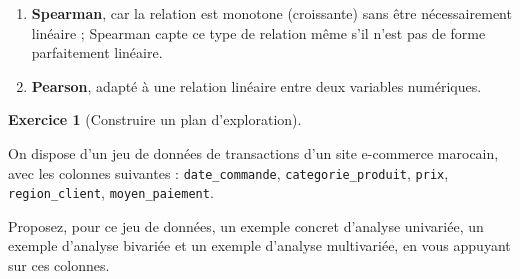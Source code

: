 \documentclass[
  french,
  letterpaper,
  open=any]{scrbook}
\providecommand{\tightlist}{%
  \setlength{\itemsep}{0pt}\setlength{\parskip}{0pt}}
\theoremstyle{definition}
\theoremstyle{definition}
\newtheorem{exercise}{Exercice}[section]
\theoremstyle{remark}
\begin{document}
\begin{tcolorbox}[enhanced jigsaw, arc=.35mm, bottomrule=.15mm, bottomtitle=1mm, breakable, colback=white, colbacktitle=quarto-callout-tip-color!10!white, colframe=quarto-callout-tip-color-frame, coltitle=black, left=2mm, leftrule=.75mm, opacityback=0, opacitybacktitle=0.6, rightrule=.15mm, title=\textcolor{quarto-callout-tip-color}{\faLightbulb}\hspace{0.5em}{Solution de l'exercice Exercice~\ref{exr-eda-2}}, titlerule=0mm, toprule=.15mm, toptitle=1mm]

\begin{enumerate}
\def\labelenumi{\alph{enumi}.}
\tightlist
\item
  \textbf{Spearman}, car la relation est monotone (croissante) sans être
  nécessairement linéaire ; Spearman capte ce type de relation même s'il
  n'est pas de forme parfaitement linéaire.
\item
  \textbf{Pearson}, adapté à une relation linéaire entre deux variables
  numériques.
\end{enumerate}

\end{tcolorbox}

\begin{exercise}[Construire un plan
d'exploration]\protect\hypertarget{exr-eda-3}{}\label{exr-eda-3}

On dispose d'un jeu de données de transactions d'un site e-commerce
marocain, avec les colonnes suivantes : \texttt{date\_commande},
\texttt{categorie\_produit}, \texttt{prix}, \texttt{region\_client},
\texttt{moyen\_paiement}.

Proposez, pour ce jeu de données, un exemple concret d'analyse
univariée, un exemple d'analyse bivariée et un exemple d'analyse
multivariée, en vous appuyant sur ces colonnes.

\end{exercise}
\end{document}
